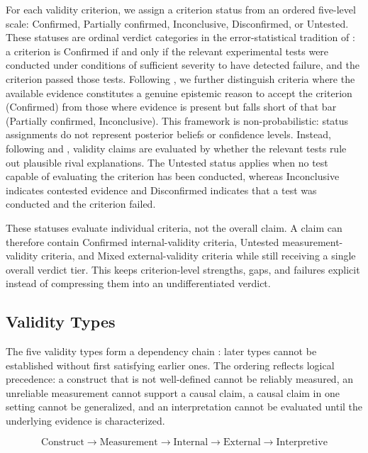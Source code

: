\documentclass{article}
\begin{document}
For each validity criterion, we assign a criterion status from an ordered five-level scale: Confirmed, Partially confirmed, Inconclusive, Disconfirmed, or Untested. These statuses are ordinal verdict categories in the error-statistical tradition of \citet{mayo1996error, mayo2018statistical}: a criterion is Confirmed if and only if the relevant experimental tests were conducted under conditions of sufficient severity to have detected failure, and the criterion passed those tests. Following \citet{achinstein2001book}, we further distinguish criteria where the available evidence constitutes a genuine epistemic reason to accept the criterion (Confirmed) from those where evidence is present but falls short of that bar (Partially confirmed, Inconclusive). This framework is non-probabilistic: status assignments do not represent posterior beliefs or confidence levels. Instead, following \citet{campbell1963experimental} and \citet{cook1979quasi}, validity claims are evaluated by whether the relevant tests rule out plausible rival explanations. The Untested status applies when no test capable of evaluating the criterion has been conducted, whereas Inconclusive indicates contested evidence and Disconfirmed indicates that a test was conducted and the criterion failed.


These statuses evaluate individual criteria, not the overall claim. A claim can therefore contain Confirmed internal-validity criteria, Untested measurement-validity criteria, and Mixed external-validity criteria while still receiving a single overall verdict tier. This keeps criterion-level strengths, gaps, and failures explicit instead of compressing them into an undifferentiated verdict.

\subsection{Validity Types}
\label{sec:validity-types}

The five validity types form a dependency chain \citep{shadish2002experimental}: later types cannot be established without first satisfying earlier ones. The ordering reflects logical precedence: a construct that is not well-defined cannot be reliably measured, an unreliable measurement cannot support a causal claim, a causal claim in one setting cannot be generalized, and an interpretation cannot be evaluated until the underlying evidence is characterized.

\begin{equation}
\text{Construct} \rightarrow \text{Measurement} \rightarrow \text{Internal} \rightarrow \text{External} \rightarrow \text{Interpretive}
\label{eq:dependency}
\end{equation}
\end{document}
